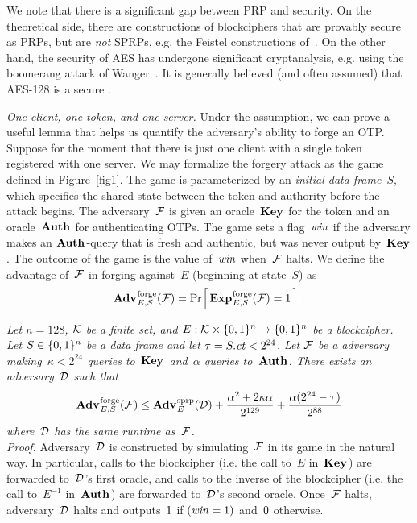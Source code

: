 We note that there is a significant gap between PRP and \sprp security. On the
theoretical side, there are constructions of blockciphers that are provably
secure as PRPs, but are \emph{not} SPRPs, e.g. the Feistel constructions
of~\cite{luby1988how}.
%
On the other hand, the \sprp security of AES has undergone significant
cryptanalysis, e.g. using the boomerang attack of
Wanger~\cite{wagner1999boomerang}. It is generally believed (and often assumed)
that AES-128 is a secure \sprp.

\textit{One client, one token, and one server.}
Under the \sprp assumption, we can prove a useful lemma that helps us quantify the
adversary's ability to forge an OTP. Suppose for the moment that there is just
one client with a single token registered with one server.
%
We may formalize the forgery attack as the game \forge defined in
Figure~\ref{fig1}. The game is parameterized by an \emph{initial data
frame}~$S$, which specifies the shared state between the token and authority
before the attack begins.
The adversary~$\mathcal{F}$ is given an oracle~$\textbf{Key}\hspace{0.5pt}$ for the
token and an oracle~$\textbf{Auth}\hspace{0.5pt}$ for authenticating OTPs.
%
The game sets a flag~$\mathit{win}$ if the
adversary makes an $\textbf{Auth}\hspace{0.5pt}$-query that is fresh and authentic, but was never
output by~$\textbf{Key}\hspace{0.5pt}$. The outcome of the game is the value of~$\mathit{win}$ when~$\mathcal{F}$
halts. We define the advantage of~$\mathcal{F}$ in forging against~$E$ (beginning at
state~$S$) as
\[
  \Adv{\forge}_{E,S}(\advF) = \Prob{\Exp{\forge}_{E,S}(\advF)\outputs\true} \,.
\]

\emph{Let $n=128$, $\mathcal{K}$ be a finite set, and
  $E:\mathcal{K}\times\{0,1\}^n\to\{0,1\}^n$ be a blockcipher.
  Let $S \in \{0,1\}^n$ be a data frame and let $\tau = S.\mathit{ct} < 2^{24}$.
  Let $\mathcal{F}$ be a \forge adversary making~$\kappa<2^{24}$ queries to~$\textbf{Key}\hspace{0.5pt}$
  and~$\alpha$
  queries to~$\textbf{Auth}\hspace{0.5pt}$.
  There exists an \sprp adversary~$\mathcal{D}$ such that
  \[
    \Adv{\forge}_{E,S}(\advF) \leq
      \Adv{\sprp}_E(\advD)
      + \frac{\alpha^2+2\kappa\alpha}{2^{129}}
      + \frac{\alpha(2^{24}-\tau)}{2^{88}}
  \]
  where~$\mathcal{D}$ has the same runtime as~$\mathcal{F}$.
}\\[2pt]
\textit{Proof.}
%
Adversary~$\mathcal{D}$ is constructed by simulating~$\mathcal{F}$ in its game in the
natural way. In particular, calls to the blockcipher (i.e. the call to~$E$
in~$\textbf{Key}\hspace{0.5pt}$) are forwarded to~$\mathcal{D}$'s first oracle, and calls to the inverse of
the blockcipher (i.e. the call to~$E^{-1}$ in~$\textbf{Auth}\hspace{0.5pt}$) are forwarded
to~$\mathcal{D}$'s second oracle. Once~$\mathcal{F}$ halts, adversary~$\mathcal{D}$ halts and
outputs~$1$ if $(\mathit{win}=1)$ and~$0$ otherwise.

